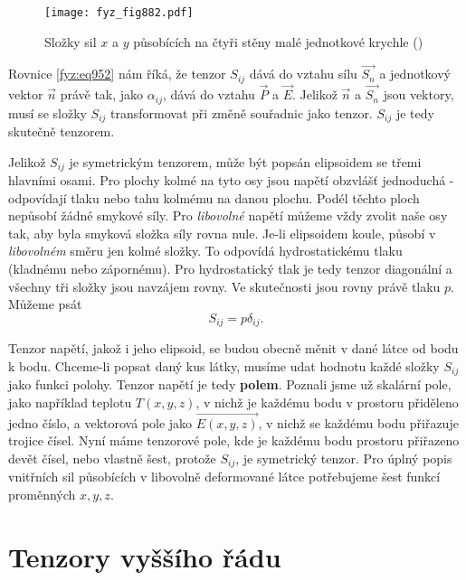 {    \begin{figure}[ht!] %
      \centering
      \texttt{[image: fyz\_fig882.pdf]}
      \caption{Složky sil \(x\) a \(y\) působících na čtyři stěny malé jednotkové krychle
               (\cite[s.~586]{Feynman02})}
      \label{fyz:fig882}
    \end{figure}

    Rovnice \eqref{fyz:eq952} nám říká, že tenzor \(S_{ij}\) dává do vztahu sílu \(\vec{S_n}\) a
    jednotkový vektor \(\vec{n}\) právě tak, jako \(\alpha_{ij}\), dává do vztahu \(\vec{P}\) a
    \(\vec{E}\). Jelikož \(\vec{n}\) a \(\vec{S_n}\) jsou vektory, musí se složky \(S_{ij}\)
    transformovat při změně souřadnic jako tenzor. \(S_{ij}\) je tedy skutečně tenzorem.

    Jelikož \(S_{ij}\) je symetrickým tenzorem, může být popsán elipsoidem se třemi hlavními osami.
    Pro plochy kolmé na tyto osy jsou napětí obzvlášť jednoduchá - odpovídají tlaku nebo tahu
    kolmému na danou plochu. Podél těchto ploch nepůsobí žádné smykové síly. Pro \emph{libovolné}
    napětí můžeme vždy zvolit naše osy tak, aby byla smyková složka síly rovna nule. Je-li
    elipsoidem koule, působí v \emph{libovolném} směru jen kolmé složky. To odpovídá hydrostatickému
    tlaku (kladnému nebo zápornému). Pro hydrostatický tlak je tedy tenzor diagonální a všechny tři
    složky jsou navzájem rovny. Ve skutečnosti jsou rovny právě tlaku \(p\). Můžeme psát
    \begin{equation}\label{fyz:eq953}
      S_{ij}=p\delta_{ij}.
    \end{equation}

    Tenzor napětí, jakož i jeho elipsoid, se budou obecně měnit v dané látce od bodu k bodu.
    Chceme-li popsat daný kus látky, musíme udat hodnotu každé složky \(S_{ij}\) jako funkci polohy.
    Tenzor napětí je tedy \textbf{polem}. Poznali jsme už skalární pole, jako například teplotu
    \(T(x,y,z)\), v nichž je každému bodu v prostoru přiděleno jedno číslo, a vektorová pole jako
    \(\vec{E(x,y,z)}\), v nichž se každému bodu přiřazuje trojice čísel. Nyní máme tenzorové pole,
    kde je každému bodu prostoru přiřazeno devět čísel, nebo vlastně šest, protože \(S_{ij}\), je
    symetrický tenzor. Pro úplný popis vnitřních sil působících v libovolně deformované látce
    potřebujeme šest funkcí proměnných \(x, y, z\).
 
  \section{Tenzory vyššího řádu}\label{fyz:IIchapXXXIsecVII}
    
}
